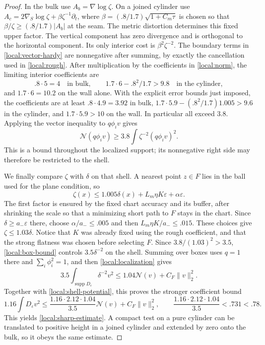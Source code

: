 \documentclass[11pt]{article}
\numberwithin{equation}{section}
\theoremstyle{definition}
\theoremstyle{remark}
\begin{document}
\begin{proof}
In the bulk use $A_b=\nabla\log\zeta$.  On a joined cylinder use
$A_c=2\nabla_S\log\zeta+\beta\zeta^{-1}\partial_t$, where
$\beta=(.8/1.7)\sqrt{1+C_m\tau}$ is chosen so that
$\beta/\zeta\ge(.8/1.7)|A_b|$ at the seam.
The metric distortion determines this fixed upper factor.
The vertical component has zero divergence and is orthogonal to
the horizontal component.  Its only interior cost is
$\beta^2\zeta^{-2}$.  The boundary terms in
\eqref{local:vector-hardy} are nonnegative after summing, by exactly
the cancellation used in \cref{local:rough}.  After multiplication
by the coefficients in \eqref{local:norm}, the limiting interior
coefficients are
\[
 .8\cdot5=4\quad\text{in bulk},\qquad
 1.7\cdot6-.8^2/1.7>9.8\quad\text{in the cylinder},
\]
and $1.7\cdot6=10.2$ on the wall alone.  With the explicit error
bounds just imposed, the coefficients are at least $.8\cdot4.9=3.92$
in bulk, $1.7\cdot5.9-(.8^2/1.7)1.005>9.6$ in the cylinder,
and $1.7\cdot5.9>10$ on the wall.  In particular all exceed $3.8$.
Applying the vector inequality to $q\phi_iv$ gives
\begin{equation}\label{local:box-bound}
 \mathcal N(q\phi_iv)\ge
       3.8\int\zeta^{-2}(q\phi_iv)^2.
\end{equation}
This is a bound throughout the localized support; its nonnegative
right side may therefore be restricted to the shell.

We finally compare $\zeta$ with $\delta$ on that shell.  A nearest
point $z\in F$ lies in the ball used for the plane condition, so
\[
 \zeta(x)\le 1.005\delta(x)+L_m\eta K\varepsilon
                                  +\alpha\varepsilon.
\]
The first factor is ensured by the fixed chart accuracy and its
buffer, after shrinking the scale so that a minimizing short path
to $F$ stays in the chart.  Since $\delta\ge a_-\varepsilon$ there,
choose $\alpha/a_-\le .005$ and then
$L_m\eta K/a_-\le .015$.  These choices give
$\zeta\le1.03\delta$.  Notice that $K$ was already fixed using the
rough coefficient, and that the strong flatness was chosen before
selecting $F$.  Since $3.8/(1.03)^2>3.5$, \eqref{local:box-bound}
controls $3.5\delta^{-2}$ on the shell.  Summing over boxes uses
$q=1$ there and $\sum_i\phi_i^2=1$, and then
\eqref{local:localization} gives
\[
 3.5\int_{\operatorname{supp} D_\varepsilon}\delta^{-2}v^2
                  \le1.04\mathcal N(v)+C_F\|v\|_2^2.
\]
Together with \eqref{local:shell-potential}, this proves the stronger
coefficient bound
\[
 1.16\int D_\varepsilon v^2
 \le\frac{1.16\cdot2.12\cdot1.04}{3.5}\mathcal N(v)
                   +C_F\|v\|_2^2,
 \qquad
 \frac{1.16\cdot2.12\cdot1.04}{3.5}<.731<.78.
\]
This yields \eqref{local:sharp-estimate}.  A compact test on a pure
cylinder can be translated to positive height in a joined cylinder
and extended by zero onto the bulk, so it obeys the same estimate.
\end{proof}
\end{document}
